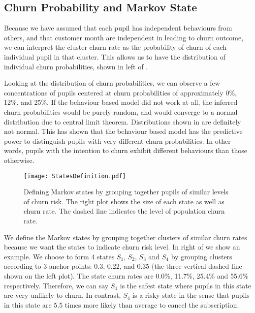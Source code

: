 \documentclass[english,a4,oneside,9pt]{extarticle}
\begin{document}
\subsection*{Churn Probability and Markov State}


Because we have assumed that each pupil has independent behaviours from others, and that customer month are independent in leading to churn outcome, we can interpret the cluster churn rate as the probability of churn of each individual pupil in that cluster. This allows us to have the distribution of individual churn probabilities, shown in left of .

Looking at the distribution of churn probabilities, we can observe a few concentrations of pupils centered at churn probabilities of approximately 0\%, 12\%, and 25\%. If the behaviour based model did not work at all, the inferred churn probabilities would be purely random, and would converge to a normal distribution due to central limit theorem. Distributions shown in  are definitely not normal. This has shown that the behaviour based model has the predictive power to distinguish pupils with very different churn probabilities. In other words, pupils with the intention to churn exhibit different behaviours than those otherwise.

\begin{figure}[htb]
\vspace*{-3mm}
\centering
\texttt{[image: StatesDefinition.pdf]}
\caption{Defining Markov states by grouping together pupils of similar levels of churn risk. The right plot shows the size of each state as well as churn rate. The dashed line indicates the level of population churn rate.}
\vspace*{-2mm}
\label{fig:state}
\end{figure}

We define the Markov states by grouping together clusters of similar churn rates because we want the states to indicate churn risk level. In right of  we show an example. We choose to form 4 states $S_1$, $S_2$, $S_3$ and $S_4$ by grouping clusters according to 3 anchor points: 0.3, 0.22, and 0.35 (the three vertical dashed line shown on the left plot). The state churn rates are 0.0\%, 11.7\%, 25.4\% and 55.6\% respectively. Therefore, we can say $S_1$ is the safest state where pupils in this state are very unlikely to churn. In contrast, $S_4$ is a risky state in the sense that pupils in this state are 5.5 times more likely than average to cancel the subscription.
\end{document}
